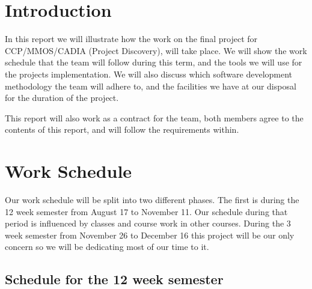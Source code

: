 \documentclass[11pt]{article}
\begin{document}


\date{\today}

\clearpage

\section*{Introduction}
In this report we will illustrate how the work on the final project for CCP/MMOS/CADIA (Project Discovery), will take place. We will show the work schedule that the team will follow during this term, and the tools we will use for the projects implementation. We will also discuss which software development methodology the team will adhere to, and the facilities we have at our disposal for the duration of the project. 

This report will also work as a contract for the team, both members agree to the contents of this report, and will follow the requirements within.

\section*{Work Schedule}
Our work schedule will be split into two different phases. The first is during the 12 week semester from August 17 to November 11. Our schedule during that period is influenced by classes and course work in other courses. During the 3 week semester from November 26 to December 16 this project will be our only concern so we will be dedicating most of our time to it. 

\subsection*{Schedule for the 12 week semester}
  
\end{document}
